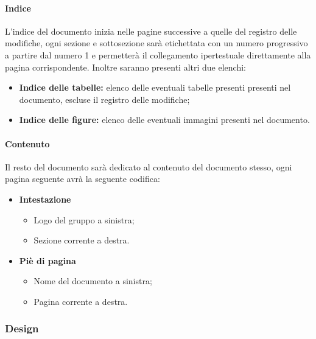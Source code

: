 \documentclass[11pt,a4paper]{article}
\begin{document}
{	\paragraph{Indice\\}
	L'indice del documento inizia nelle pagine successive a quelle del registro delle modifiche, ogni sezione e sottosezione sarà etichettata con un numero progressivo a partire dal numero 1 e permetterà il collegamento ipertestuale direttamente alla pagina corrispondente. Inoltre saranno presenti altri due elenchi:
	
	\begin{itemize}
		\item \textbf{Indice delle tabelle:} elenco delle eventuali tabelle presenti presenti nel documento, escluse il registro delle modifiche;
		\item  \textbf{Indice delle figure:} elenco delle eventuali immagini presenti nel documento. 
	\end{itemize}
	
	\paragraph{Contenuto\\}
	Il resto del documento sarà dedicato al contenuto del documento stesso, ogni pagina seguente avrà la seguente codifica:
	\begin{itemize}
		\item \textbf{Intestazione}
		\begin{itemize}
			\item Logo del gruppo a sinistra;
			\item Sezione corrente a destra.
		\end{itemize}
		
		\item \textbf{Piè di pagina} 
		\begin{itemize}
			\item Nome del documento a sinistra;
			\item Pagina corrente a destra.
		\end{itemize}
	\end{itemize}
	
	\subsubsection{Design}
	
}
\end{document}
